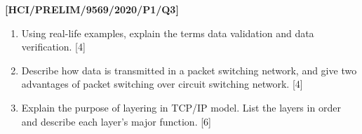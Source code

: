 \item \textbf{{[}HCI/PRELIM/9569/2020/P1/Q3{]} }
\begin{enumerate}
\item Using real-life examples, explain the terms data validation and data
verification. \hfill{}{[}4{]}
\item Describe how data is transmitted in a packet switching network, and
give two advantages of packet switching over circuit switching network.\hfill{}
{[}4{]}
\item Explain the purpose of layering in TCP/IP model. List the layers in
order and describe each layer\textquoteright s major function. \hfill{}{[}6{]}
\end{enumerate}